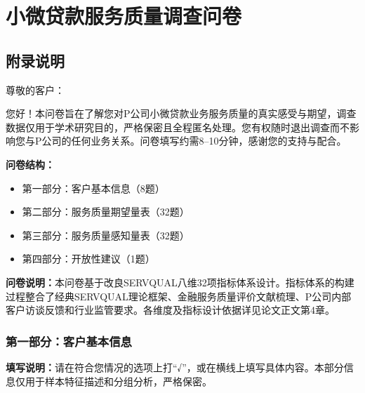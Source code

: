 \appendix
\chapter{小微贷款服务质量调查问卷}

\section*{附录说明}

尊敬的客户：

您好！本问卷旨在了解您对P公司小微贷款业务服务质量的真实感受与期望，调查数据仅用于学术研究目的，严格保密且全程匿名处理。您有权随时退出调查而不影响您与P公司的任何业务关系。问卷填写约需8--10分钟，感谢您的支持与配合。

\vspace{1em}
\noindent\textbf{问卷结构：}
\begin{itemize}
  \item 第一部分：客户基本信息（8题）
  \item 第二部分：服务质量期望量表（32题）
  \item 第三部分：服务质量感知量表（32题）
  \item 第四部分：开放性建议（1题）
\end{itemize}

\vspace{1em}
\textbf{问卷说明：}本问卷基于改良SERVQUAL八维32项指标体系设计。指标体系的构建过程整合了经典SERVQUAL理论框架、金融服务质量评价文献梳理、P公司内部客户访谈反馈和行业监管要求。各维度及指标设计依据详见论文正文第4章。

\newpage

\subsection*{第一部分：客户基本信息}

\textbf{填写说明：}请在符合您情况的选项上打“√”，或在横线上填写具体内容。本部分信息仅用于样本特征描述和分组分析，严格保密。

